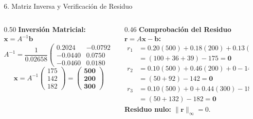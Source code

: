 \documentclass[
  spanish,
  aspectratio=169,
  xcolor={dvipsnames,table}
]{beamer}
\begin{document}
\begin{frame}{6. Matriz Inversa y Verificación de Residuo}
  \begin{columns}[T]
    \begin{column}{0.50\textwidth}
      \textbf{\color{uanlblue}Inversión Matricial: $\mathbf{x} = A^{-1}\mathbf{b}$}
      $$A^{-1} = \frac{1}{0.02658} \begin{pmatrix}
        0.2024 & -0.0792 & -0.0598 \\
        -0.0440 & 0.0750 & 0.0130 \\
        -0.0460 & 0.0180 & 0.0740
      \end{pmatrix}$$
      $$\mathbf{x} = A^{-1} \begin{pmatrix} 175 \\ 142 \\ 182 \end{pmatrix} = \begin{pmatrix} \mathbf{500} \\ \mathbf{200} \\ \mathbf{300} \end{pmatrix}$$
    \end{column}
    \begin{column}{0.46\textwidth}
      \textbf{\color{uanlblue}Comprobación del Residuo $\mathbf{r} = A\mathbf{x} - \mathbf{b}$:}
      \begin{align*}
        r_1 &= 0.20(500) + 0.18(200) + 0.13(300) - 175 \\
            &= (100 + 36 + 39) - 175 = \mathbf{0} \\[0.15cm]
        r_2 &= 0.10(500) + 0.46(200) + 0 - 142 \\
            &= (50 + 92) - 142 = \mathbf{0} \\[0.15cm]
        r_3 &= 0.10(500) + 0 + 0.44(300) - 182 \\
            &= (50 + 132) - 182 = \mathbf{0}
      \end{align*}
      \textbf{Residuo nulo:} $\|\mathbf{r}\|_\infty = 0$.
    \end{column}
  \end{columns}
\end{frame}
\end{document}
